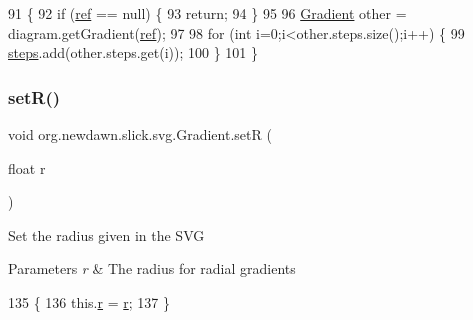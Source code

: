 \begin{DoxyCode}
91                                          \{
92         \textcolor{keywordflow}{if} (\mbox{\hyperlink{classorg_1_1newdawn_1_1slick_1_1svg_1_1_gradient_af0df4455cb66dc48f4bcef9c24b3f886}{ref}} == null) \{
93             \textcolor{keywordflow}{return};
94         \}
95         
96         \mbox{\hyperlink{classorg_1_1newdawn_1_1slick_1_1svg_1_1_gradient_a23077edba4cd72aa5afb3b1b6a98b71a}{Gradient}} other = diagram.getGradient(\mbox{\hyperlink{classorg_1_1newdawn_1_1slick_1_1svg_1_1_gradient_af0df4455cb66dc48f4bcef9c24b3f886}{ref}});
97         
98         \textcolor{keywordflow}{for} (\textcolor{keywordtype}{int} i=0;i<other.steps.size();i++) \{
99             \mbox{\hyperlink{classorg_1_1newdawn_1_1slick_1_1svg_1_1_gradient_a68867778840106c7c126e26065b86bb0}{steps}}.add(other.steps.get(i));
100         \}
101     \}
\end{DoxyCode}
\mbox{\label{classorg_1_1newdawn_1_1slick_1_1svg_1_1_gradient_ab3472739ac84f25ac23f955065fbf41d}} 
\subsubsection{\texorpdfstring{set\+R()}{setR()}}
{\footnotesize\ttfamily void org.\+newdawn.\+slick.\+svg.\+Gradient.\+setR (\begin{DoxyParamCaption}\item[{float}]{r }\end{DoxyParamCaption})\hspace{0.3cm}{\ttfamily [inline]}}

Set the radius given in the S\+VG


\begin{DoxyParams}{Parameters}
{\em r} & The radius for radial gradients \\
\hline
\end{DoxyParams}

\begin{DoxyCode}
135                               \{
136         this.\mbox{\hyperlink{classorg_1_1newdawn_1_1slick_1_1svg_1_1_gradient_a9eb9e743742ccbcdbcd4118d9457de24}{r}} = \mbox{\hyperlink{classorg_1_1newdawn_1_1slick_1_1svg_1_1_gradient_a9eb9e743742ccbcdbcd4118d9457de24}{r}};
137     \}
\end{DoxyCode}
\mbox{\label{classorg_1_1newdawn_1_1slick_1_1svg_1_1_gradient_a5b0a0622fadf0a16ddecd4068354aecf}} 
